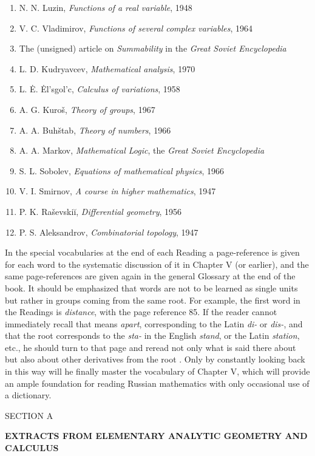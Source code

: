 \begin{enumerate}[leftmargin=2.4em]
\item N. N. Luzin, \emph{Functions of a real variable}, 1948
\item V. C. Vladimirov, \emph{Functions of several complex variables}, 1964
\item The (unsigned) article on \emph{Summability} in the \emph{Great Soviet Encyclopedia}
\item L. D. Kudryavcev, \emph{Mathematical analysis}, 1970
\item L. Ė. Ėl'sgol'c, \emph{Calculus of variations}, 1958
\item A. G. Kuroš, \emph{Theory of groups}, 1967
\item A. A. Buhštab, \emph{Theory of numbers}, 1966
\item A. A. Markov, \emph{Mathematical Logic}, the \emph{Great Soviet Encyclopedia}
\item S. L. Sobolev, \emph{Equations of mathematical physics}, 1966
\item V. I. Smirnov, \emph{A course in higher mathematics}, 1947
\item P. K. Raševskiĭ, \emph{Differential geometry}, 1956
\item P. S. Aleksandrov, \emph{Combinatorial topology}, 1947
\end{enumerate}

In the special vocabularies at the end of each Reading a page-reference is given for each word to the systematic discussion of it in Chapter V (or earlier), and the same page-references are given again in the general Glossary at the end of the book. It should be emphasized that words are not to be learned as single units but rather in groups coming from the same root. For example, the first word in the Readings is  \emph{distance}, with the page reference 85. If the reader cannot immediately recall that  means \emph{apart}, corresponding to the Latin \emph{di-} or \emph{dis-}, and that the root  corresponds to the \emph{sta-} in the English \emph{stand}, or the Latin \emph{station}, etc., he should turn to that page and reread not only what is said there about  but also about other derivatives from the root . Only by constantly looking back in this way will he finally master the vocabulary of Chapter V, which will provide an ample foundation for reading Russian mathematics with only occasional use of a dictionary.

\clearpage
\begin{center}
{\sffamily\color{BellaBlue}\Large SECTION A\par}
\vspace{0.8ex}
{\bfseries\Large EXTRACTS FROM ELEMENTARY ANALYTIC GEOMETRY AND CALCULUS\par}
\end{center}

